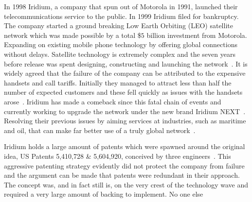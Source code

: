 {}

In 1998 Iridium, a company that spun out of Motorola in 1991, launched their telecommunications service to the public.
In 1999 Iridium filed for bankruptcy.
The company started a ground breaking Low Earth Orbiting (LEO) satellite network which was made possible by a total \$$5$ billion investment from Motorola.
Expanding on existing mobile phone technology by offering global connections without delays.
Satellite technology is extremely complex and the seven years before release was spent designing, constructing and launching the network~\cite{fink2000iridium}. 
It is widely agreed that the failure of the company can be attributed to the expensive handsets and call tariffs.
Initially they managed to attract less than half the number of expected customers and these fell quickly as issues with the handsets arose~\cite{bill1999}.
Iridium has made a comeback since this fatal chain of events and currently working to upgrade the network under the new brand Iridium NEXT~\cite{iridiumNEXT}.
Resolving their previous issues by aiming services at industries, such as maritime and oil, that can make far better use of a truly global network~\cite{better2009}.

Iridium holds a large amount of patents which were spawned around the original idea, US Patents 5,410,728 \& 5,604,920, conceived by three engineers~\cite{ip2010,bertiger1995satellite,bertiger1997satellite}.
This aggressive patenting strategy evidently did not protect the company from failure and the argument can be made that patents were redundant in their approach.
The concept was, and in fact still is, on the very crest of the technology wave and required a very large amount of backing to implement.
No one else 
